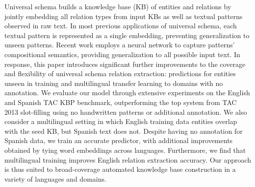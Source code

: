 Universal schema builds a knowledge base (KB) of entities and relations by jointly embedding all relation types from input KBs as well as textual patterns observed in raw text. In most previous applications of universal schema, each textual pattern is represented as a single embedding, preventing generalization to unseen patterns. Recent work employs a neural network to capture patterns' compositional semantics, providing generalization to all possible input text. In response, this paper introduces significant further improvements to the coverage and flexibility of universal schema relation extraction: predictions for entities unseen in training and multilingual transfer learning to domains with no annotation. We evaluate our model through extensive experiments on the English and Spanish TAC KBP benchmark, outperforming the top system from TAC 2013 slot-filling using no handwritten patterns or additional annotation. We also consider a multilingual setting in which English training data entities overlap with the seed KB, but Spanish text does not. Despite having no annotation for Spanish data, we train an accurate predictor, with additional improvements obtained by tying word embeddings across languages. Furthermore, we find that multilingual training improves English relation extraction accuracy. Our approach is thus suited to broad-coverage automated knowledge base construction in a variety of languages and domains.
